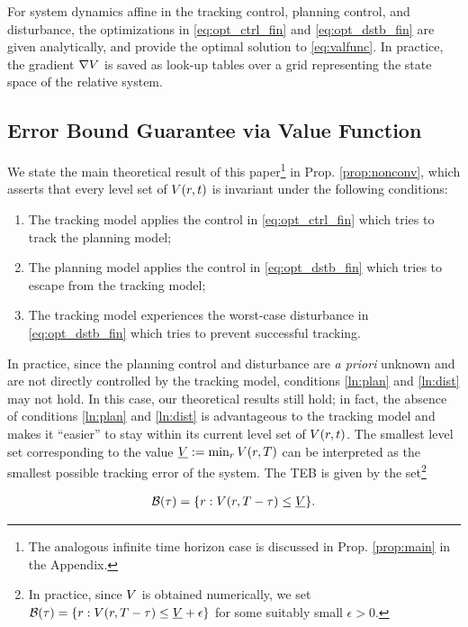For system dynamics affine in the tracking control, planning control, and disturbance, the optimizations in \eqref{eq:opt_ctrl_fin} and \eqref{eq:opt_dstb_fin} are given analytically, and provide the optimal solution to \eqref{eq:valfunc}.
In practice, the gradient $\nabla V$ is saved as look-up tables over a grid representing the state space of the relative system.

\subsection{Error Bound Guarantee via Value Function} \label{sec:proofs}
We state the main theoretical result of this paper\footnote{The analogous infinite time horizon case is discussed in Prop. \ref{prop:main} in the Appendix.} in Prop. \ref{prop:nonconv}, which asserts that every level set of $V(r, t)$ is invariant under the following conditions:
\begin{enumerate}
  \item The tracking model applies the control in \eqref{eq:opt_ctrl_fin} which tries to track the planning model;
  \item The planning model applies the control in \eqref{eq:opt_dstb_fin} which tries to escape from the tracking model; \label{ln:plan}
  \item The tracking model experiences the worst-case disturbance in \eqref{eq:opt_dstb_fin} which tries to prevent successful tracking. \label{ln:dist}
\end{enumerate}

In practice, since the planning control and disturbance are \textit{a priori} unknown and are not directly controlled by the tracking model, conditions \ref{ln:plan} and \ref{ln:dist} may not hold. In this case, our theoretical results still hold; in fact, the absence of conditions \ref{ln:plan} and \ref{ln:dist} is advantageous to the tracking model and makes it ``easier'' to stay within its current level set of $V(r, t)$. 
The smallest level set corresponding to the value $\underline{V} := \min_{r} V(r,T)$ can be interpreted as the smallest possible tracking error of the system. 
The TEB is given by the set\footnote{In practice, since $V$ is obtained numerically, we set $\mathcal B(\tau) = \{r: V(r, T - \tau) \le \underline{V} + \epsilon\}$ for some suitably small $\epsilon>0$.}

\begin{align} \label{eq:TEB_fin}
\TEB(\tau) = \{\rstate: \valfunc(\rstate, \thor - \tau) \le \underline\valfunc\}.
\end{align}


